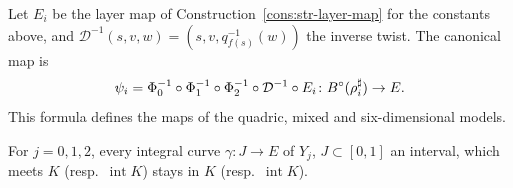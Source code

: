 \begin{construction}\label{cons:native-packing}
Let $E_i$ be the layer map of Construction~\ref{cons:str-layer-map} for the constants above, and $\mathcal
D^{-1}(s,v,w)=(s,v,q_{f(s)}^{-1}(w))$ the inverse twist. The canonical map is
\[
 \psi_i=\Phi_0^{-1}\circ\Phi_1^{-1}\circ\Phi_2^{-1}\circ\mathcal D^{-1}\circ E_i\colon B^{\circ}(\rho_i^\sharp)\to E .
\]
This formula defines the maps of the quadric, mixed and six-dimensional models.
\end{construction}

\begin{lemma}\label{lem:native-collar}
For $j=0,1,2$, every integral curve $\gamma\colon J\to E$ of $Y_j$, $J\subset[0,1]$ an interval, which meets $K$ (resp.\
$\operatorname{int}K$) stays in $K$ (resp.\ $\operatorname{int}K$).
\end{lemma}

